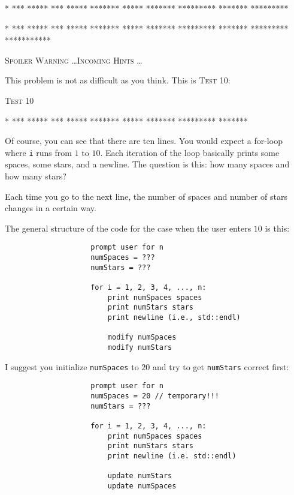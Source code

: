 \nextt
\begin{console}[commandchars=\\\{\}]
    *
   ***
  *****
   ***
  *****
 *******
  *****
 *******
*********
 *******
*********
\end{console}

\nextt
\begin{console}[commandchars=\\\{\}]
     *
    ***
   *****
    ***
   *****
  *******
   *****
  *******
 *********
  *******
 *********
***********
\end{console}


\newpage
\textsc{\large Spoiler Warning \dots Incoming Hints \dots}

This problem is not as difficult as you think. This is \textsc{Test 10}:

\textsc{Test 10}
\begin{console}[commandchars=\\\{\}]
    *
   ***
  *****
   ***
  *****
 *******
  *****
 *******
*********
 *******
\end{console}

Of course, you can see that there are ten lines. You would expect a for-loop
where \verb!i! runs from $1$ to $10$. Each iteration of the loop basically
prints some spaces, some stars, and a newline. The question is this: how many
spaces and how many stars?

Each time you go to the next line, the number of spaces and number of stars
changes in a certain way.

The general structure of the code for the case when the user enters $10$ is
this:

\begin{verbatim}
                    prompt user for n
                    numSpaces = ???
                    numStars = ???

                    for i = 1, 2, 3, 4, ..., n:
                        print numSpaces spaces
                        print numStars stars
                        print newline (i.e., std::endl)

                        modify numSpaces
                        modify numStars
\end{verbatim}

I suggest you initialize \verb!numSpaces! to $20$ and try to get \verb!numStars!
correct first:

\begin{verbatim}
                    prompt user for n
                    numSpaces = 20 // temporary!!!
                    numStars = ???

                    for i = 1, 2, 3, 4, ..., n:
                        print numSpaces spaces
                        print numStars stars
                        print newline (i.e. std::endl)

                        update numStars
                        update numSpaces
\end{verbatim}

